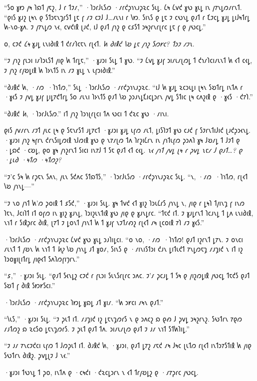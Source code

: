 “𐑕𐑴 𐑣𐑽 𐑢𐑰 𐑐𐑸𐑑 𐑢𐑱𐑟, 𐑓 𐑩 𐑑𐑲𐑥,” ·𐑐𐑮𐑩𐑓𐑧𐑕𐑼 ·𐑥𐑩𐑒𐑜𐑪𐑯𐑨𐑜𐑷𐑤 𐑕𐑧𐑛. 𐑖𐑰 𐑖𐑫𐑒 𐑣𐑻 𐑣𐑧𐑛 𐑦𐑯 𐑢𐑳𐑯𐑛𐑼𐑥𐑩𐑯𐑑. “𐑞𐑦𐑕 𐑣𐑨𐑟 𐑚𐑰𐑯 𐑞 𐑕𐑑𐑮𐑱𐑯𐑡𐑩𐑕𐑑 𐑛𐑱 𐑝 𐑥𐑲 𐑤𐑲𐑓 𐑓…𐑥𐑧𐑯𐑦 𐑩 𐑘𐑽. 𐑕𐑦𐑯𐑕 𐑞 𐑛𐑱 𐑲 𐑤𐑻𐑯𐑛 𐑞𐑨𐑑 𐑩 𐑗𐑲𐑤𐑛 𐑣𐑨𐑛 𐑛𐑦𐑓𐑰𐑑𐑩𐑛 𐑿-𐑯𐑴-𐑣𐑵. 𐑲 𐑢𐑳𐑯𐑛𐑼 𐑯𐑬, 𐑤𐑫𐑒𐑦𐑙 𐑚𐑨𐑒, 𐑦𐑓 𐑞𐑨𐑑 𐑢𐑪𐑟 𐑞 𐑤𐑭𐑕𐑑 𐑮𐑰𐑟𐑩𐑯𐑩𐑚𐑩𐑤 𐑛𐑱 𐑝 𐑞 𐑢𐑻𐑤𐑛.”

𐑴, 𐑤𐑲𐑒 \emph{𐑖𐑰} 𐑣𐑨𐑛 𐑧𐑯𐑦𐑔𐑦𐑙 𐑑 𐑒𐑩𐑥𐑐𐑤𐑱𐑯 𐑩𐑚𐑬𐑑. \emph{𐑿 𐑔𐑦𐑙𐑒 𐑘𐑹 𐑛𐑱 𐑢𐑪𐑟 𐑕𐑼𐑾𐑤? 𐑑𐑮𐑲 𐑥𐑲𐑯.}

“𐑲 𐑢𐑪𐑟 𐑝𐑧𐑮𐑦 𐑦𐑥𐑐𐑮𐑧𐑕𐑑 𐑢𐑦𐑞 𐑿 𐑑𐑩𐑛𐑱,” ·𐑣𐑨𐑮𐑦 𐑕𐑧𐑛 𐑑 𐑣𐑻. “𐑲 𐑖𐑫𐑛 𐑣𐑨𐑝 𐑮𐑦𐑥𐑧𐑥𐑚𐑼𐑛 𐑑 𐑒𐑪𐑥𐑐𐑤𐑦𐑥𐑧𐑯𐑑 𐑿 𐑬𐑑 𐑤𐑬𐑛, 𐑲 𐑢𐑪𐑟 𐑩𐑢𐑹𐑛𐑦𐑙 𐑿 𐑐𐑶𐑯𐑑𐑕 𐑦𐑯 𐑥𐑲 𐑣𐑧𐑛 𐑯 𐑧𐑝𐑮𐑦𐑔𐑦𐑙.”

“𐑔𐑨𐑙𐑒 𐑿, ·𐑥𐑼~·𐑐𐑪𐑑𐑼,” 𐑕𐑧𐑛 ·𐑐𐑮𐑩𐑓𐑧𐑕𐑼 ·𐑥𐑩𐑒𐑜𐑪𐑯𐑨𐑜𐑷𐑤. “𐑦𐑓 𐑿 𐑣𐑨𐑛 𐑷𐑤𐑮𐑧𐑛𐑦 𐑚𐑰𐑯 𐑕𐑹𐑑𐑩𐑛 𐑦𐑯𐑑𐑵 𐑩 ·𐑣𐑬𐑕 𐑲 𐑢𐑫𐑛 𐑣𐑨𐑝 𐑛𐑦𐑛𐑳𐑒𐑑𐑩𐑛 𐑕𐑴 𐑥𐑧𐑯𐑦 𐑐𐑶𐑯𐑑𐑕 𐑞𐑨𐑑 𐑘𐑹 𐑜𐑮𐑨𐑯𐑛𐑗𐑦𐑤𐑛𐑮𐑩𐑯 𐑢𐑫𐑛 𐑕𐑑𐑦𐑤 𐑚𐑰 𐑤𐑵𐑟𐑦𐑙 𐑞 ·𐑣𐑬𐑕 ·𐑒𐑳𐑐.”

“𐑔𐑨𐑙𐑒 \emph{𐑿}, ·𐑐𐑮𐑩𐑓𐑧𐑕𐑼.” 𐑦𐑑 𐑢𐑪𐑟 𐑐𐑮𐑪𐑚𐑩𐑚𐑤𐑦 𐑑𐑵 𐑻𐑤𐑦 𐑑 𐑒𐑷𐑤 𐑣𐑻 ·𐑥𐑦𐑯𐑦.

𐑞𐑦𐑕 𐑢𐑫𐑥𐑩𐑯 𐑥𐑲𐑑 𐑢𐑧𐑤 𐑚𐑰 𐑞 𐑕𐑱𐑯𐑩𐑕𐑑 𐑨𐑛𐑳𐑤𐑑 ·𐑣𐑨𐑮𐑦 𐑣𐑨𐑛 𐑧𐑝𐑼 𐑥𐑧𐑑, 𐑛𐑦𐑕𐑐𐑲𐑑 𐑣𐑻 𐑤𐑨𐑒 𐑝 𐑕𐑲𐑩𐑯𐑑𐑦𐑓𐑦𐑒 𐑚𐑨𐑒𐑜𐑮𐑬𐑯𐑛. ·𐑣𐑨𐑮𐑦 𐑢𐑪𐑟 𐑰𐑝𐑩𐑯 𐑒𐑩𐑯𐑕𐑦𐑛𐑼𐑦𐑙 𐑪𐑓𐑼𐑦𐑙 𐑣𐑻 𐑞 𐑯𐑳𐑥𐑚𐑼 𐑑𐑵 𐑐𐑩𐑟𐑦𐑖𐑩𐑯 𐑦𐑯 𐑢𐑪𐑑𐑧𐑝𐑼 𐑜𐑮𐑵𐑐 𐑣𐑰 𐑓𐑹𐑥𐑛 𐑑 𐑓𐑲𐑑 𐑞 ·𐑛𐑸𐑒 ·𐑤𐑹𐑛, 𐑞𐑴 𐑣𐑰 𐑢𐑪𐑟𐑩𐑯𐑑 𐑕𐑦𐑤𐑦 𐑦𐑯𐑳𐑓 𐑑 𐑕𐑱 𐑞𐑨𐑑 𐑬𐑑 𐑤𐑬𐑛. \emph{𐑯𐑬 𐑢𐑪𐑑 𐑢𐑫𐑛 𐑚𐑰 𐑩 𐑜𐑫𐑛 𐑯𐑱𐑥 𐑓 𐑞𐑨𐑑…? 𐑞 ·𐑛𐑧𐑔 ·𐑰𐑑𐑼 ·𐑰𐑑𐑼𐑟?}

“𐑲'𐑤 𐑕𐑰 𐑿 𐑩𐑜𐑱𐑯 𐑕𐑵𐑯, 𐑢𐑧𐑯 𐑕𐑒𐑵𐑤 𐑕𐑑𐑸𐑑𐑕,” ·𐑐𐑮𐑩𐑓𐑧𐑕𐑼 ·𐑥𐑩𐑒𐑜𐑪𐑯𐑨𐑜𐑷𐑤 𐑕𐑧𐑛. “𐑯, ·𐑥𐑼~·𐑐𐑪𐑑𐑼, 𐑩𐑚𐑬𐑑 𐑘𐑹 𐑢𐑪𐑯𐑛—”

“𐑲 𐑯𐑴 𐑢𐑪𐑑 𐑿'𐑼 𐑜𐑴𐑦𐑙 𐑑 𐑭𐑕𐑒,” ·𐑣𐑨𐑮𐑦 𐑕𐑧𐑛. 𐑣𐑰 𐑑𐑫𐑒 𐑬𐑑 𐑣𐑦𐑟 𐑐𐑮𐑧𐑖𐑩𐑕 𐑢𐑪𐑯𐑛 𐑯, 𐑢𐑦𐑞 𐑩 𐑛𐑰𐑐 𐑑𐑢𐑦𐑯𐑡 𐑝 𐑦𐑯𐑼 𐑐𐑱𐑯, 𐑓𐑤𐑦𐑐𐑑 𐑦𐑑 𐑴𐑝𐑼 𐑦𐑯 𐑣𐑦𐑟 𐑣𐑨𐑯𐑛, 𐑐𐑮𐑦𐑟𐑧𐑯𐑑𐑦𐑙 𐑣𐑻 𐑢𐑦𐑞 𐑞 𐑣𐑨𐑯𐑛𐑩𐑤. “𐑑𐑱𐑒 𐑦𐑑. 𐑲 𐑣𐑨𐑛𐑩𐑯𐑑 𐑐𐑤𐑨𐑯𐑛 𐑑 𐑛𐑵 𐑧𐑯𐑦𐑔𐑦𐑙, 𐑯𐑪𐑑 𐑩 𐑕𐑦𐑙𐑜𐑩𐑤 𐑔𐑦𐑙, 𐑚𐑳𐑑 𐑲 𐑛𐑴𐑯𐑑 𐑢𐑪𐑯𐑑 𐑿 𐑑 𐑣𐑨𐑝 𐑯𐑲𐑑𐑥𐑺𐑟 𐑩𐑚𐑬𐑑 𐑥𐑰 𐑚𐑤𐑴𐑦𐑙 𐑳𐑐 𐑥𐑲 𐑣𐑬𐑕.”

·𐑐𐑮𐑩𐑓𐑧𐑕𐑼 ·𐑥𐑩𐑒𐑜𐑪𐑯𐑨𐑜𐑷𐑤 𐑖𐑫𐑒 𐑣𐑻 𐑣𐑧𐑛 𐑮𐑨𐑐𐑦𐑛𐑤𐑦. “𐑴 𐑯𐑴, ·𐑥𐑼~·𐑐𐑪𐑑𐑼! 𐑞𐑨𐑑 𐑦𐑟𐑩𐑯𐑑 𐑛𐑳𐑯. 𐑲 𐑴𐑯𐑤𐑦 𐑥𐑧𐑯𐑑 𐑑 𐑢𐑹𐑯 𐑿 𐑯𐑪𐑑 𐑑 \emph{𐑿𐑟} 𐑘𐑹 𐑢𐑪𐑯𐑛 𐑨𐑑 𐑣𐑴𐑥, 𐑕𐑦𐑯𐑕 𐑞 ·𐑥𐑦𐑯𐑦𐑕𐑑𐑮𐑦 𐑒𐑨𐑯 𐑛𐑦𐑑𐑧𐑒𐑑 𐑳𐑯𐑛𐑼𐑱𐑡 𐑥𐑨𐑡𐑦𐑒 𐑯 𐑦𐑑 𐑦𐑟 𐑐𐑮𐑴𐑣𐑦𐑚𐑦𐑑𐑩𐑛 𐑢𐑦𐑞𐑬𐑑 𐑕𐑵𐑐𐑼𐑝𐑦𐑠𐑩𐑯.”

“𐑭,” ·𐑣𐑨𐑮𐑦 𐑕𐑧𐑛. “𐑞𐑨𐑑 𐑕𐑬𐑯𐑛𐑟 𐑤𐑲𐑒 𐑩 𐑝𐑧𐑮𐑦 𐑕𐑧𐑯𐑕𐑩𐑚𐑩𐑤 𐑮𐑵𐑤. 𐑲'𐑥 𐑜𐑤𐑨𐑛 𐑑 𐑕𐑰 𐑞 𐑢𐑦𐑟𐑼𐑛𐑦𐑙 𐑢𐑻𐑤𐑛 𐑑𐑱𐑒𐑕 𐑞𐑨𐑑 𐑕𐑹𐑑 𐑝 𐑔𐑦𐑙 𐑕𐑽𐑾𐑕𐑤𐑦.”

·𐑐𐑮𐑩𐑓𐑧𐑕𐑼 ·𐑥𐑩𐑒𐑜𐑪𐑯𐑨𐑜𐑷𐑤 𐑐𐑽𐑛 𐑣𐑸𐑛 𐑨𐑑 𐑣𐑦𐑥. “𐑿 𐑮𐑾𐑤𐑦 𐑥𐑰𐑯 𐑞𐑨𐑑.”

“𐑘𐑧𐑕,” ·𐑣𐑨𐑮𐑦 𐑕𐑧𐑛. “𐑲 𐑜𐑧𐑑 𐑦𐑑. 𐑥𐑨𐑡𐑦𐑒 𐑦𐑟 𐑛𐑱𐑯𐑡𐑼𐑩𐑕 𐑯 𐑞 𐑮𐑵𐑤𐑟 𐑸 𐑞𐑺 𐑓 𐑜𐑫𐑛 𐑮𐑰𐑟𐑩𐑯𐑟. 𐑕𐑻𐑑𐑩𐑯 𐑳𐑞𐑼 𐑥𐑨𐑑𐑼𐑟 𐑸 𐑷𐑤𐑕𐑴 𐑛𐑱𐑯𐑡𐑼𐑩𐑕. 𐑲 𐑜𐑧𐑑 𐑞𐑨𐑑 𐑑𐑵. 𐑮𐑦𐑥𐑧𐑥𐑚𐑼 𐑞𐑨𐑑 𐑲 𐑨𐑥 𐑯𐑪𐑑 𐑕𐑑𐑿𐑐𐑦𐑛.”

“𐑲 𐑨𐑥 𐑳𐑯𐑤𐑲𐑒𐑤𐑦 𐑧𐑝𐑼 𐑑 𐑓𐑼𐑜𐑧𐑑 𐑦𐑑. 𐑔𐑨𐑙𐑒 𐑿, ·𐑣𐑨𐑮𐑦, 𐑞𐑨𐑑 𐑛𐑳𐑟 𐑥𐑱𐑒 𐑥𐑰 𐑓𐑰𐑤 𐑚𐑧𐑑𐑼 𐑩𐑚𐑬𐑑 𐑦𐑯𐑑𐑮𐑳𐑕𐑑𐑦𐑙 𐑿 𐑢𐑦𐑞 𐑕𐑻𐑑𐑩𐑯 𐑔𐑦𐑙𐑟. 𐑜𐑫𐑛𐑚𐑲 𐑓 𐑯𐑬.”

·𐑣𐑨𐑮𐑦 𐑑𐑻𐑯𐑛 𐑑 𐑜𐑴, 𐑦𐑯𐑑𐑵 𐑞 ·𐑤𐑰𐑒𐑦 ·𐑒𐑷𐑤𐑛𐑮𐑩𐑯 𐑯 𐑬𐑑 𐑑𐑩𐑢𐑹𐑛𐑟 𐑞 ·𐑥𐑳𐑜𐑩𐑤 𐑢𐑻𐑤𐑛.

